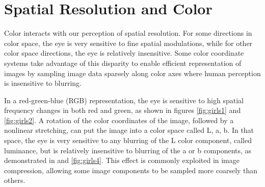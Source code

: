 \section{Spatial Resolution and Color}

Color interacts with our perception of spatial resolution.  For some directions in color space, the eye is very sensitive to fine spatial modulations, while for other color space directions, the eye is relatively insensitive.  Some color coordinate systems take advantage of this disparity to enable efficient representation of images by sampling image data sparsely along color axes where human perception is insensitive to blurring.

In a red-green-blue (RGB) representation, the eye is sensitive to high spatial frequency changes in both red and green, as shown in figures \ref{fig:girls1} and \ref{fig:girls2}.  A rotation of the color coordinates of the image, followed by a nonlinear stretching, can put the image into a color space called L, a, b.  In that space, the eye is very sensitive to any blurring of the L color component, called luminance, but is relatively insensitive to blurring of the a or b components, as demonstrated in \fig{\ref{fig:girls3}} and \ref{fig:girls4}.  This effect is commonly exploited in image compression, allowing some image components to be sampled more coarsely than others.


